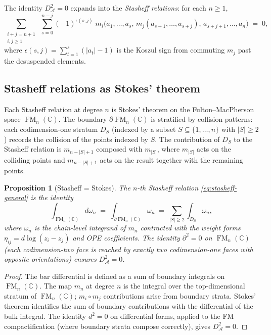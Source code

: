 \documentclass[11pt,reqno]{amsart}
\newtheorem{proposition}[theorem]{Proposition}
\theoremstyle{definition}
\theoremstyle{remark}
\newcommand{\cA}{\mathcal{A}}
\newcommand{\CC}{\mathbb{C}}
\DeclareMathOperator{\FM}{FM}
\numberwithin{equation}{section}
\providecommand{\ClaimStatusProvedHere}{}
\begin{document}
The identity $D_\cA^2 = 0$ expands into the
\emph{Stasheff relations}: for each $n \geq 1$,
\begin{equation}\label{eq:stasheff-general}
  \sum_{\substack{i+j = n+1 \\ i,j \geq 1}}
  \;\sum_{s=0}^{n-j}
  (-1)^{\epsilon(s,j)}\;
  m_i\bigl(a_1, \ldots, a_s,\,
  m_j(a_{s+1}, \ldots, a_{s+j}),\,
  a_{s+j+1}, \ldots, a_n\bigr)
  \;=\; 0,
\end{equation}
where $\epsilon(s,j) = \sum_{t=1}^{s}(|a_t|-1)$ is the
Koszul sign from commuting $m_j$ past the desuspended elements.

\subsection{Stasheff relations as Stokes' theorem}

Each Stasheff relation at degree $n$ is Stokes' theorem on the
Fulton--MacPherson space $\FM_n(\CC)$.  The boundary
$\partial\FM_n(\CC)$ is stratified by collision patterns: each
codimension-one stratum $D_S$ (indexed by a subset
$S \subseteq \{1,\ldots,n\}$ with $|S| \geq 2$) records the
collision of the points indexed by $S$.  The contribution of
$D_S$ to the Stasheff relation is $m_{n-|S|+1}$ composed with
$m_{|S|}$, where $m_{|S|}$ acts on the colliding points and
$m_{n-|S|+1}$ acts on the result together with the remaining
points.

\begin{proposition}[Stasheff = Stokes]
\label{prop:stasheff-stokes}
\ClaimStatusProvedHere{}
The $n$-th Stasheff relation \eqref{eq:stasheff-general} is
the identity
\[
  \int_{\FM_n(\CC)} d\omega_n \;=\;
  \int_{\partial\FM_n(\CC)} \omega_n
  \;=\;
  \sum_{|S| \geq 2}
  \int_{D_S} \omega_n,
\]
where $\omega_n$ is the chain-level integrand of $m_n$ contracted
with the weight forms
$\eta_{ij} = d\log(z_i - z_j)$ and OPE coefficients.  The
identity $\partial^2 = 0$ on $\FM_n(\CC)$ (each
codimension-two face is reached by exactly two codimension-one
faces with opposite orientations) ensures $D_\cA^2 = 0$.
\end{proposition}

\begin{proof}
The bar differential is defined as a sum of boundary integrals
on $\FM_n(\CC)$.  The map $m_n$ at degree $n$ is the integral
over the top-dimensional stratum of $\FM_n(\CC)$;
$m_i \circ m_j$ contributions arise from boundary strata.
Stokes' theorem identifies the sum of boundary contributions
with the differential of the bulk integral.  The identity
$d^2 = 0$ on differential forms, applied to the FM
compactification (where boundary strata compose correctly),
gives $D_\cA^2 = 0$.
\end{proof}
\end{document}
